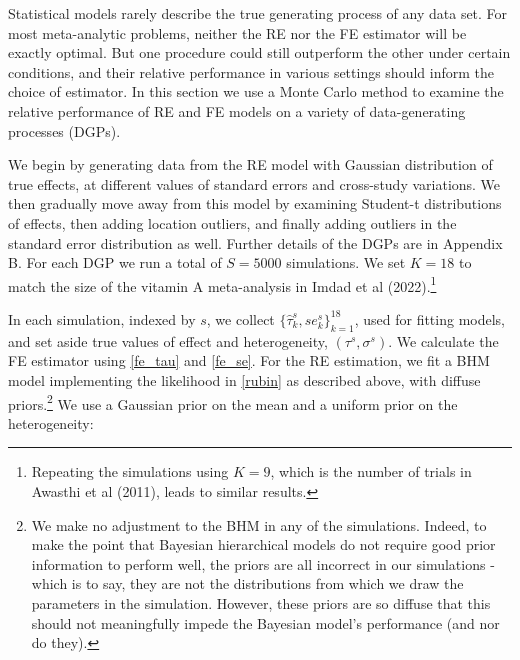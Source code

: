 \documentclass[12pt]{article}
\begin{document}
Statistical models rarely describe the true generating process of any data set. For most meta-analytic problems, neither the RE nor the FE estimator will be exactly optimal. But one procedure could still outperform the other under certain conditions, and their relative performance in various settings should inform the choice of estimator. In this section we use a Monte Carlo method to examine the relative performance of RE and FE models on a variety of data-generating processes (DGPs).

We begin by generating data from the RE model with Gaussian distribution of true effects, at different values of standard errors and cross-study variations. We then gradually move away from this model by examining Student-t distributions of effects, then adding location outliers, and finally adding outliers in the standard error distribution as well. Further details of the DGPs are in Appendix B. For each DGP we run a total of $S = 5000$ simulations. We set $K=18$ to match the size of the vitamin A meta-analysis in Imdad et al (2022).\footnote{Repeating the simulations using $K=9$, which is the number of trials in Awasthi et al (2011), leads to similar results.}

In each simulation, indexed by $s$, we collect $\{\hat{\tau}_k^s, se_k^s\}_{k=1}^18$, used for fitting models, and set aside true values of effect and heterogeneity, $(\tau^{s}, \sigma^{s})$. We calculate the FE estimator using \eqref{fe_tau} and \eqref{fe_se}. For the RE estimation, we fit a BHM model implementing the likelihood in \eqref{rubin} as described above, with diffuse priors.\footnote{We make no adjustment to the BHM in any of the simulations. Indeed, to make the point that Bayesian hierarchical models do not require good prior information to perform well, the priors are all incorrect in our simulations - which is to say, they are not the distributions from which we draw the parameters in the simulation. However, these priors are so diffuse that this should not meaningfully impede the Bayesian model's performance (and nor do they).} We use a Gaussian prior on the mean and a uniform prior on the heterogeneity:

% 
% 
\end{document}
